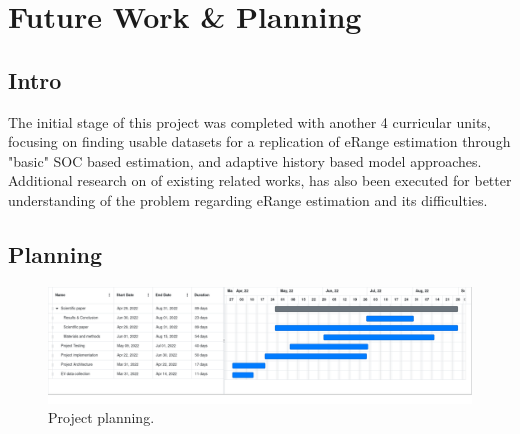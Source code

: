 \chapter{Future Work \& Planning}
\label{cha:planning}

\section{Intro}

The initial stage of this project was
completed with another 4 curricular units,
focusing on finding usable datasets for 
a replication of \gls{eRange} estimation
through "basic" \gls{SOC} based estimation, 
and adaptive history based model approaches.
Additional research on of existing related works,
has also been executed for better understanding
of the problem regarding \gls{eRange} estimation
and its difficulties.

\section{Planning}

\begin{figure}[H]
    \begin{center}
        \includegraphics[scale=0.27]{../figures/planning}
        \caption{Project planning.}
    \end{center}
\end{figure}